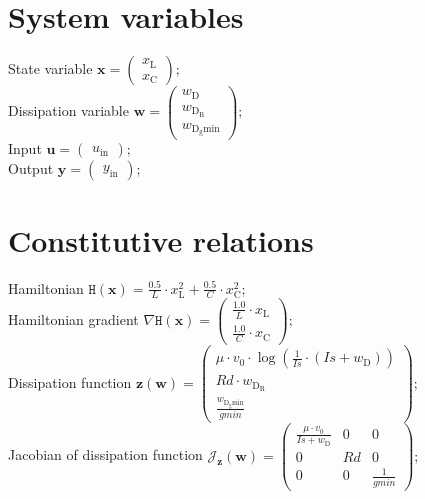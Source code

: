 \documentclass[11pt, oneside]{article}      %
\begin{document}
\section{System variables}
%
State variable $ \mathbf{x} = \left(\begin{array}{c}x_{\mathrm{L}}\\x_{\mathrm{C}}\end{array}\right) ; $ 
%
\\
%
Dissipation variable $ \mathbf{w} = \left(\begin{array}{c}w_{\mathrm{D}}\\w_{\mathrm{D_R}}\\w_{\mathrm{D_gmin}}\end{array}\right) ; $ 
%
\\
%
Input $ \mathbf{u} = \left(\begin{array}{c}u_{\mathrm{in}}\end{array}\right) ; $ 
%
\\
%
Output $ \mathbf{y} = \left(\begin{array}{c}y_{\mathrm{in}}\end{array}\right) ; $ 
%
\\
%
%
\section{Constitutive relations}
%
Hamiltonian $ \mathtt{H}(\mathbf{x}) = \frac{0.5}{L} \cdot x_{\mathrm{L}}^{2} + \frac{0.5}{C} \cdot x_{\mathrm{C}}^{2} ; $ 
%
\\
%
Hamiltonian gradient $ \nabla \mathtt{H}(\mathbf{x}) = \left(\begin{array}{c}\frac{1.0}{L} \cdot x_{\mathrm{L}}\\\frac{1.0}{C} \cdot x_{\mathrm{C}}\end{array}\right) ; $ 
%
\\
%
Dissipation function $ \mathbf{z}(\mathbf{w}) = \left(\begin{array}{c}\mu \cdot v_{0} \cdot \log{\left (\frac{1}{Is} \cdot \left(Is + w_{\mathrm{D}}\right) \right )}\\Rd \cdot w_{\mathrm{D_R}}\\\frac{w_{\mathrm{D_gmin}}}{gmin}\end{array}\right) ; $ 
%
\\
%
Jacobian of dissipation function $ \mathcal{J}_{\mathbf{z}}(\mathbf{w}) = \left(\begin{array}{ccc}\frac{\mu \cdot v_{0}}{Is + w_{\mathrm{D}}} & 0 & 0\\0 & Rd & 0\\0 & 0 & \frac{1}{gmin}\end{array}\right) ; $ 
%
\\
%
%
\end{document}
